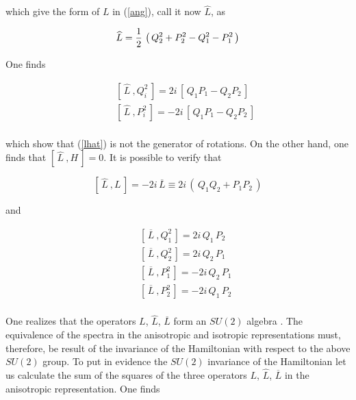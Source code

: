 \documentclass[a4paper,aps,prd,preprint]{revtex4}
\begin{document}
    which give the form of $L$ in (\ref{ang}), call it now  $\widehat L$, as 
    
    \begin{equation}
     \widehat L={1\over 2}\, \left(\, Q_2^2+ P_2^2-Q_1^2-P_1^2\, \right)
     \label{lhat}
     \end{equation}
    
    
    
     One finds 
    
    \begin{eqnarray}
    &&\left[\,\widehat L\ , Q_i^2\,\right]= 2i\,\left[\, Q_1 P_1 - Q_2 P_2\,
    \right]
    \label{chat1} \\
    && \left[\,\widehat L\ , P_i^2\,\right]= 
    -2i\,\left[\, Q_1 P_1 - Q_2 P_2\,\right]
    \label{chat2}\\
    \end{eqnarray}
    
    which show that (\ref{lhat}) is not the generator of   rotations.
    On the other hand, one finds that $\left[\,\widehat L\ , H\, \right]=0$. 
    It is possible to verify that 
    
    \begin{equation}
    \left[\,\widehat L\ , L\,\right]= -2i \,\overline L\equiv 2i\, 
    \left(\, Q_1 Q_2 + P_1 P_2\,\right)
    \end{equation}
    
     and 
    
    \begin{eqnarray}
    &&\left[\,\overline L\ , Q_1^2\,\right]= 2i\, Q_1\, P_2 
    \label{chat3} \\
    && \left[\,\overline L\ , Q_2^2\,\right]= 2i\, Q_2\, P_1 
    \label{chat4} \\
    && \left[\,\overline L\ , P_1^2\,\right]= -2i\, Q_2\, P_1 
    \label{chat5}\\
    && \left[\,\overline L\ , P_2^2\,\right]= -2i\, Q_1\, P_2 
    \label{chat6}\\
    \end{eqnarray}
    
    One realizes that the operators $L$, $\widehat L$,
    $ \overline L$ form an $SU(2)$ algebra \cite{bellucci}.
    The equivalence of the spectra in the anisotropic
    and isotropic representations must, therefore, be result of the invariance 
    of the Hamiltonian with respect to the above $SU(2)$ group.
    To put in evidence the $SU(2)$ invariance of the Hamiltonian  let us 
    calculate the sum of the squares of the three operators $L$, $\widehat L$, 
    $\overline L$ in the anisotropic representation. One finds
     
\end{document}
